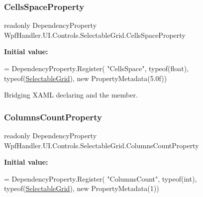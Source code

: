 \subsubsection{\texorpdfstring{Cells\+Space\+Property}{CellsSpaceProperty}}
{\footnotesize\ttfamily readonly Dependency\+Property Wpf\+Handler.\+U\+I.\+Controls.\+Selectable\+Grid.\+Cells\+Space\+Property\hspace{0.3cm}{\ttfamily [static]}}

{\bfseries Initial value\+:}
\begin{DoxyCode}
= DependencyProperty.Register(
            \textcolor{stringliteral}{"CellsSpace"}, typeof(\textcolor{keywordtype}{float}), typeof(\mbox{\hyperlink{class_wpf_handler_1_1_u_i_1_1_controls_1_1_selectable_grid_a3968411e99848235dfb6bdb7ec0f8fc5}{SelectableGrid}}), \textcolor{keyword}{new} PropertyMetadata(5.0f))
\end{DoxyCode}


Bridging X\+A\+ML declaring and the member. 

\mbox{\label{class_wpf_handler_1_1_u_i_1_1_controls_1_1_selectable_grid_ae01cdb093f79b7c6a66afee98475c64a}} 
\subsubsection{\texorpdfstring{Columns\+Count\+Property}{ColumnsCountProperty}}
{\footnotesize\ttfamily readonly Dependency\+Property Wpf\+Handler.\+U\+I.\+Controls.\+Selectable\+Grid.\+Columns\+Count\+Property\hspace{0.3cm}{\ttfamily [static]}}

{\bfseries Initial value\+:}
\begin{DoxyCode}
= DependencyProperty.Register(
          \textcolor{stringliteral}{"ColumnsCount"}, typeof(\textcolor{keywordtype}{int}), typeof(\mbox{\hyperlink{class_wpf_handler_1_1_u_i_1_1_controls_1_1_selectable_grid_a3968411e99848235dfb6bdb7ec0f8fc5}{SelectableGrid}}), \textcolor{keyword}{new} PropertyMetadata(1))
\end{DoxyCode}


